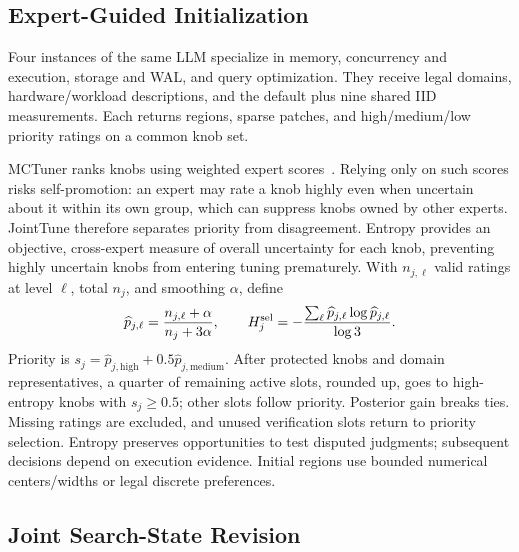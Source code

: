 \documentclass[runningheads]{llncs}
\begin{document}
\subsection{Expert-Guided Initialization}\label{sec:initialization}

Four instances of the same LLM specialize in memory, concurrency and
execution, storage and WAL, and query optimization. They receive legal
domains, hardware/workload descriptions, and the default plus nine shared
IID measurements. Each returns regions, sparse patches, and
high/medium/low priority ratings on a common knob set.

MCTuner ranks knobs using weighted expert scores~\cite{mctuner}.
Relying only on such scores risks self-promotion: an expert may rate a knob
highly even when uncertain about it within its own group, which can suppress
knobs owned by other experts. JointTune therefore separates priority from
disagreement. Entropy provides an objective, cross-expert measure of overall
uncertainty for each knob, preventing highly uncertain knobs from entering
tuning prematurely. With $n_{j,\ell}$ valid ratings at level $\ell$, total
$n_j$, and smoothing $\alpha$, define
\begin{equation}
 \widehat p_{j,\ell}=\frac{n_{j,\ell}+\alpha}{n_j+3\alpha},\qquad
 H_j^{\rm sel}=-\frac{\sum_\ell\widehat p_{j,\ell}
                              \log\widehat p_{j,\ell}}{\log3}.
 \label{eq:ct-initial-entropy}
\end{equation}
Priority is $s_j=\widehat p_{j,\mathrm{high}}+
0.5\widehat p_{j,\mathrm{medium}}$. After protected knobs and domain
representatives, a quarter of remaining active slots, rounded up, goes to
high-entropy knobs with $s_j\geq0.5$; other slots follow priority.
Posterior gain breaks ties. Missing ratings are excluded, and unused
verification slots return to priority selection. Entropy preserves
opportunities to test disputed judgments; subsequent decisions depend on
execution evidence. Initial regions use bounded numerical centers/widths
or legal discrete preferences.

\subsection{Joint Search-State Revision}\label{sec:knob-selection}
\end{document}
